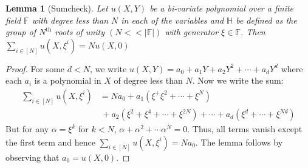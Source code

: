 \documentclass[sigconf]{acmart}
\newtheorem{lemma}{Lemma}[section]
\newcommand{\nroots}{\mathbb{H}}
\newcommand{\F}{\mathbb{F}}
\providecommand{\DIFaddend}{} %
\DeclareRobustCommand{\DIFaddend}{\DIFOaddend \let\includegraphics\DIFOincludegraphics} %
\begin{document}

	\DIFaddend 
	
	\begin{lemma}[Sumcheck]\label{lem:sumcheck}
		Let $u(X,Y)$ be a bi-variate polynomial over a finite field $\F$ with degree less than $N$ in each of the variables and
		$\nroots$ be defined as the group of $N^{\text{th}}$ roots of unity $(N<<|\F|)$
		with generator $\xi \in \F$. Then $\sum_{i\in [N]}u(X,\xi^i)= Nu(X,0)$
	\end{lemma}
	
	\begin{proof}
		For some $d<N$, we write $u(X,Y)=a_0+a_1 Y+ a_2 Y^2+\cdots+ a_d Y^d$
		where each $a_i$ is a polynomial in $X$ of degree less than $N$.
		Now we write the sum:
		\begin{align*}
			\sum_{i\in [N]}u(X,\xi^i) &= N a_0+a_1(\xi^+\xi^2+\cdots+\xi^N) \\
			&\, +a_2(\xi^2+\xi^4+\cdots+\xi^{2N})+ \cdots + a_d(\xi^d+\cdots +\xi^{Nd})
		\end{align*}
		But for any $\alpha=\xi^k$ for $k<N$, $\alpha+\alpha^2+\cdots \alpha^N=0$. Thus, all terms vanish except the first term
		and hence $\sum_{i\in [N]}u(X,\xi^i)=N a_0$.
		The lemma follows by observing that $a_0=u(X, 0)$.
	\end{proof}
	
\end{document}
